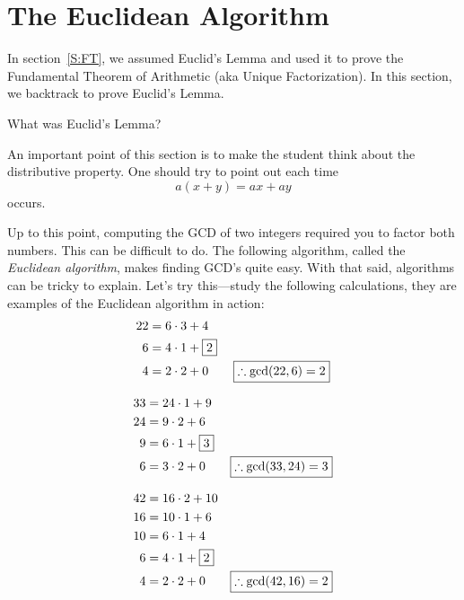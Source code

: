 \newpage 


\section{The Euclidean Algorithm}\label{S:EA}
In section~\ref{S:FT}, we assumed Euclid's Lemma and used it to prove the Fundamental 
Theorem of Arithmetic (aka Unique Factorization).  In this section, we backtrack 
to prove Euclid's Lemma.  

\begin{question}
What was Euclid's Lemma?
\end{question}
\QM

\begin{teachingnote}
An important point of this section is to make the student think about
the distributive property. One should try to point out each time
\[
a(x+y) = ax + ay
\]
occurs.
\end{teachingnote}

Up to this point, computing the GCD of two integers required you to
factor both numbers.  This can be difficult to do. The following
algorithm, called the \textit{Euclidean algorithm}, makes finding
GCD's quite easy. With that said, algorithms can be tricky to
explain. Let's try this---study the following calculations, they are
examples of the Euclidean algorithm in action:
\begin{align*}
22 &= 6\cdot 3 + 4\\ 
6 &= 4\cdot 1 + \fbox{$2$}\\ 4 &= 2 \cdot 2 + 0 \qquad 
\fbox{$\therefore \gcd(22,6) = 2$}
\end{align*}

\begin{align*}
33 &= 24\cdot 1 + 9\\
24 &= 9 \cdot 2 + 6\\
9 &= 6 \cdot 1 + \fbox{$3$}\\
6 &= 3 \cdot 2 + 0 \qquad \fbox{$\therefore \gcd(33,24) = 3$} 
\end{align*}

\begin{align*}
42 &= 16\cdot 2 + 10\\
16 &= 10 \cdot 1 + 6\\
10 &= 6 \cdot 1 + 4\\
6 &= 4 \cdot 1 + \fbox{$2$}\\
4 &= 2 \cdot 2 + 0 \qquad \fbox{$\therefore \gcd(42,16) = 2$} 
\end{align*}


